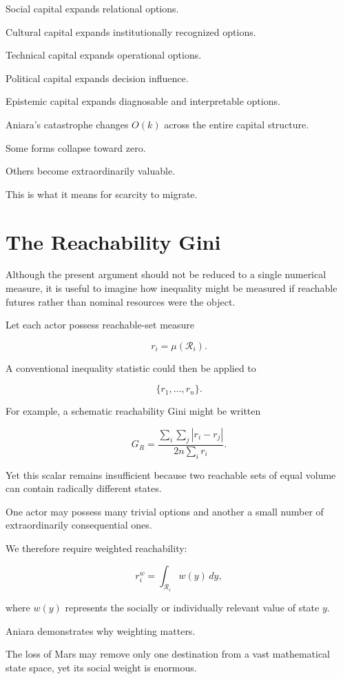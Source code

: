 \documentclass[11pt,oneside]{book}
\theoremstyle{definition}
\theoremstyle{remark}
\newcommand{\R}{\mathcal{R}}
\begin{document}
Social capital expands relational options.

Cultural capital expands institutionally recognized options.

Technical capital expands operational options.

Political capital expands decision influence.

Epistemic capital expands diagnosable and interpretable options.

Aniara's catastrophe changes \(O(k)\) across the entire capital structure.

Some forms collapse toward zero.

Others become extraordinarily valuable.

This is what it means for scarcity to migrate.

\section{The Reachability Gini}

Although the present argument should not be reduced to a single numerical measure, it is useful to imagine how inequality might be measured if reachable futures rather than nominal resources were the object.

Let each actor possess reachable-set measure

\[
r_i=\mu(\R_i).
\]

A conventional inequality statistic could then be applied to

\[
\{r_1,\ldots,r_n\}.
\]

For example, a schematic reachability Gini might be written

\[
G_R
=
\frac{
\sum_i\sum_j|r_i-r_j|
}{
2n\sum_i r_i
}.
\]

Yet this scalar remains insufficient because two reachable sets of equal volume can contain radically different states.

One actor may possess many trivial options and another a small number of extraordinarily consequential ones.

We therefore require weighted reachability:

\[
r_i^w
=
\int_{\R_i}
w(y)\,dy,
\]

where \(w(y)\) represents the socially or individually relevant value of state \(y\).

Aniara demonstrates why weighting matters.

The loss of Mars may remove only one destination from a vast mathematical state space, yet its social weight is enormous.
\end{document}

